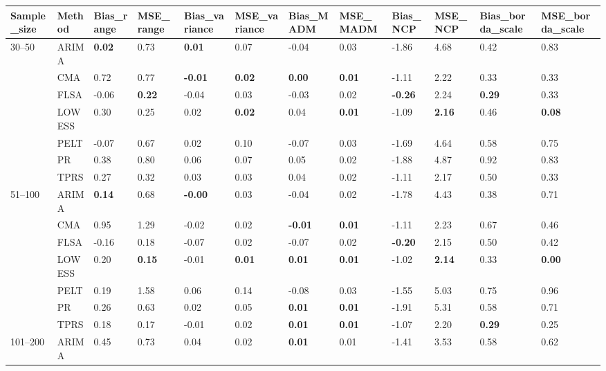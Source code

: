 \begin{table}[ht]
\centering
\begin{tabular}{llllllllllll}
  \toprule
Sample_size & Method & Bias_range & MSE_range & Bias_variance & MSE_variance & Bias_MADM & MSE_MADM & Bias_NCP & MSE_NCP & Bias_borda_scale & MSE_borda_scale \\ 
  \midrule
30–50 & ARIMA & \textbf{0.02} & 0.73 & \textbf{0.01} & 0.07 & -0.04 & 0.03 & -1.86 & 4.68 & 0.42 & 0.83 \\ 
   & CMA & 0.72 & 0.77 & \textbf{-0.01} & \textbf{0.02} & \textbf{0.00} & \textbf{0.01} & -1.11 & 2.22 & 0.33 & 0.33 \\ 
   & FLSA & -0.06 & \textbf{0.22} & -0.04 & 0.03 & -0.03 & 0.02 & \textbf{-0.26} & 2.24 & \textbf{0.29} & 0.33 \\ 
   & LOWESS & 0.30 & 0.25 & 0.02 & \textbf{0.02} & 0.04 & \textbf{0.01} & -1.09 & \textbf{2.16} & 0.46 & \textbf{0.08} \\ 
   & PELT & -0.07 & 0.67 & 0.02 & 0.10 & -0.07 & 0.03 & -1.69 & 4.64 & 0.58 & 0.75 \\ 
   & PR & 0.38 & 0.80 & 0.06 & 0.07 & 0.05 & 0.02 & -1.88 & 4.87 & 0.92 & 0.83 \\ 
   & TPRS & 0.27 & 0.32 & 0.03 & 0.03 & 0.04 & 0.02 & -1.11 & 2.17 & 0.50 & 0.33 \\ 
  51–100 & ARIMA & \textbf{0.14} & 0.68 & \textbf{-0.00} & 0.03 & -0.04 & 0.02 & -1.78 & 4.43 & 0.38 & 0.71 \\ 
   & CMA & 0.95 & 1.29 & -0.02 & 0.02 & \textbf{-0.01} & \textbf{0.01} & -1.11 & 2.23 & 0.67 & 0.46 \\ 
   & FLSA & -0.16 & 0.18 & -0.07 & 0.02 & -0.07 & 0.02 & \textbf{-0.20} & 2.15 & 0.50 & 0.42 \\ 
   & LOWESS & 0.20 & \textbf{0.15} & -0.01 & \textbf{0.01} & \textbf{0.01} & \textbf{0.01} & -1.02 & \textbf{2.14} & 0.33 & \textbf{0.00} \\ 
   & PELT & 0.19 & 1.58 & 0.06 & 0.14 & -0.08 & 0.03 & -1.55 & 5.03 & 0.75 & 0.96 \\ 
   & PR & 0.26 & 0.63 & 0.02 & 0.05 & \textbf{0.01} & \textbf{0.01} & -1.91 & 5.31 & 0.58 & 0.71 \\ 
   & TPRS & 0.18 & 0.17 & -0.01 & 0.02 & \textbf{0.01} & \textbf{0.01} & -1.07 & 2.20 & \textbf{0.29} & 0.25 \\ 
  101–200 & ARIMA & 0.45 & 0.73 & 0.04 & 0.02 & \textbf{0.01} & 0.01 & -1.41 & 3.53 & 0.58 & 0.62 \\ 

\end{tabular}
\end{table}
